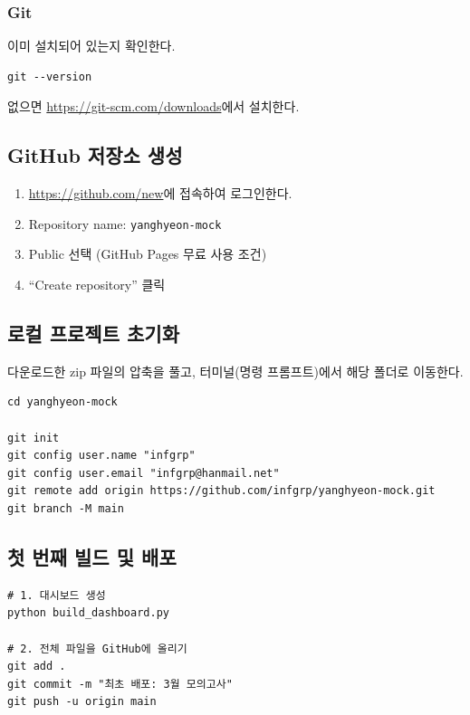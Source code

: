 \documentclass[11pt,a4paper]{article}
\begin{document}
\subsubsection{Git}

이미 설치되어 있는지 확인한다.

\begin{lstlisting}
git --version
\end{lstlisting}

없으면 \url{https://git-scm.com/downloads}에서 설치한다.

\subsection{GitHub 저장소 생성}

\begin{enumerate}
  \item \url{https://github.com/new}에 접속하여 로그인한다.
  \item Repository name: \texttt{yanghyeon-mock}
  \item Public 선택 (GitHub Pages 무료 사용 조건)
  \item ``Create repository'' 클릭
\end{enumerate}

\subsection{로컬 프로젝트 초기화}

다운로드한 zip 파일의 압축을 풀고, 터미널(명령 프롬프트)에서 해당 폴더로 이동한다.

\begin{lstlisting}
cd yanghyeon-mock

git init
git config user.name "infgrp"
git config user.email "infgrp@hanmail.net"
git remote add origin https://github.com/infgrp/yanghyeon-mock.git
git branch -M main
\end{lstlisting}

\subsection{첫 번째 빌드 및 배포}

\begin{lstlisting}
# 1. 대시보드 생성
python build_dashboard.py

# 2. 전체 파일을 GitHub에 올리기
git add .
git commit -m "최초 배포: 3월 모의고사"
git push -u origin main
\end{lstlisting}
\end{document}
